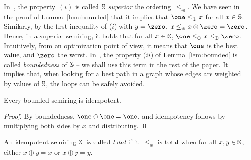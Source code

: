 In~\cite{Huang08advanceddynamic}, the property~$(i)$ 
is called $\mathbb{S}$ \emph{superior} \wrt the ordering~$\leq_\oplus$.
We have seen in the proof of Lemma~\ref{lem:bounded} that it implies that 
$\one \leq_\oplus x$ for all $x \in \mathbb{S}$.
Similarly, by the first inequality of ($i$) with $y = \zero$,  
$x \leq_\oplus x \otimes \zero = \zero$.
%
Hence, in a superior semiring, %
it holds that %
for all $x \in \mathbb{S}$, $\one \leq_\oplus x \leq_\oplus \zero$.
%
Intuitively, from an optimization point of view,
it means that $\one$ is the best value, and $\zero$ the worst.
%
In~\cite{Mohri02semiring}, the property ($ii$) of Lemma~\ref{lem:bounded}  
is called \emph{boundedness} of $\mathbb{S}$ -- we shall use this term in the rest of the paper. 
It implies that, when looking for a best path in a graph whose edges
are weighted by values of $\mathbb{S}$, the loops can be safely avoided.



\begin{lemma}
Every bounded semiring is idempotent.
\end{lemma}
\begin{proof}
By boundedness, $\one \oplus \one = \one$, 
and idempotency follows by multiplying
both sides by $x$ and distributing. 
\qed
\end{proof}

\noindent
An idempotent semiring $\mathbb{S}$~is called \emph{total} if
it~$\leq_\oplus$ is total
\ie when for all $x, y \in \mathbb{S}$, either $x \oplus y = x$ or $x \oplus y = y$.

